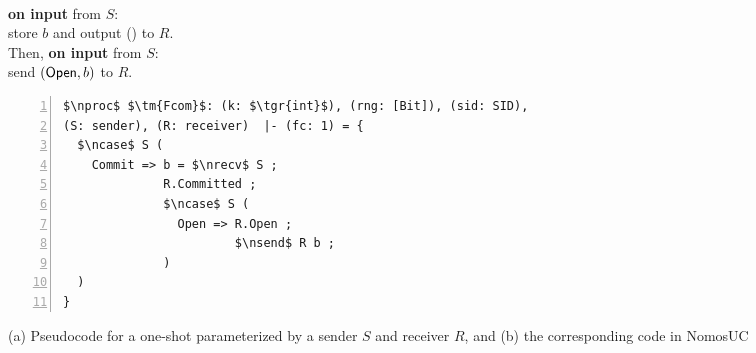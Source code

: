 \begin{figure}
\centering
\begin{minipage}{0.38\textwidth}
\begin{bbox}[title={Functionality $\F_{\m{com}}(S, R)$}]\\
\textbf{on input}  from $S$:\\
\hspace*{1em} store $b$ and output () to $R$.\\
 Then, \textbf{on input}  from $S$:\\
 \hspace*{1em} send $(\mathsf{Open}, b)$ to $R$.
\end{bbox}
\end{minipage}
\hspace{3em}
\begin{minipage}{0.5\textwidth}
\begin{lstlisting}[basicstyle=\scriptsize\BeraMonottFamily, frame=single, mathescape, numbers=left, xleftmargin=2em, xrightmargin=2em]
$\nproc$ $\tm{Fcom}$: (k: $\tgr{int}$), (rng: [Bit]), (sid: SID),
(S: sender), (R: receiver)  |- (fc: 1) = {
  $\ncase$ S (
    Commit => b = $\nrecv$ S ;
              R.Committed ;
              $\ncase$ S (
                Open => R.Open ;
                        $\nsend$ R b ;
              )
  )
}
\end{lstlisting}
\end{minipage}
\caption{(a) Pseudocode for a one-shot \Fcom parameterized by a sender $S$ and receiver $R$,
and (b) the corresponding code in NomosUC}
\label{fig:fcomideal}
\vspace{-4mm}
\end{figure}

